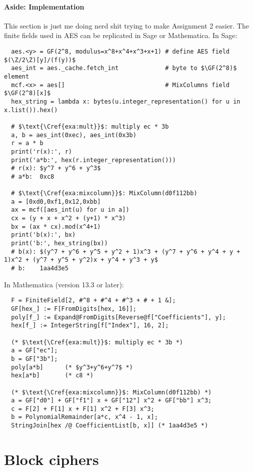 \documentclass[class=co487,tikz,minted,notes]{agony}
\begin{document}
\paragraph{Aside: Implementation}
This section is just me doing nerd shit trying to make Assignment 2 easier.
The finite fields used in AES can be replicated in Sage or Mathematica.
In Sage:
\begin{verbatim}
  aes.<y> = GF(2^8, modulus=x^8+x^4+x^3+x+1) # define AES field $(\Z/2\Z)[y]/(f(y))$
  aes_int = aes._cache.fetch_int             # byte to $\GF(2^8)$ element
  mcf.<x> = aes[]                            # MixColumns field $\GF(2^8)[x]$
  hex_string = lambda x: bytes(u.integer_representation() for u in x.list()).hex()

  # $\text{\Cref{exa:mult}}$: multiply ec * 3b
  a, b = aes_int(0xec), aes_int(0x3b)
  r = a * b
  print('r(x):', r)
  print('a*b:', hex(r.integer_representation()))
  # r(x): $y^7 + y^6 + y^3$
  # a*b:  0xc8

  # $\text{\Cref{exa:mixcolumn}}$: MixColumn(d0f112bb)
  a = [0xd0,0xf1,0x12,0xbb]
  ax = mcf([aes_int(u) for u in a])
  cx = (y + x + x^2 + (y+1) * x^3)
  bx = (ax * cx).mod(x^4+1)
  print('b(x):', bx)
  print('b:', hex_string(bx))
  # b(x): $(y^7 + y^6 + y^5 + y^2 + 1)x^3 + (y^7 + y^6 + y^4 + y + 1)x^2 + (y^7 + y^5 + y^2)x + y^4 + y^3 + y$
  # b:    1aa4d3e5
\end{verbatim}

In Mathematica (version 13.3 or later):
\begin{verbatim}
  F = FiniteField[2, #^8 + #^4 + #^3 + # + 1 &];
  GF[hex_] := F[FromDigits[hex, 16]];
  poly[f_] := Expand@FromDigits[Reverse@f["Coefficients"], y];
  hex[f_] := IntegerString[f["Index"], 16, 2];

  (* $\text{\Cref{exa:mult}}$: multiply ec * 3b *)
  a = GF["ec"];
  b = GF["3b"];
  poly[a*b]      (* $y^3+y^6+y^7$ *)
  hex[a*b]       (* c8 *)

  (* $\text{\Cref{exa:mixcolumn}}$: MixColumn(d0f112bb) *)
  a = GF["d0"] + GF["f1"] x + GF["12"] x^2 + GF["bb"] x^3;
  c = F[2] + F[1] x + F[1] x^2 + F[3] x^3;
  b = PolynomialRemainder[a*c, x^4 - 1, x];
  StringJoin[hex /@ CoefficientList[b, x]] (* 1aa4d3e5 *)
\end{verbatim}


\section{Block ciphers}
\end{document}
